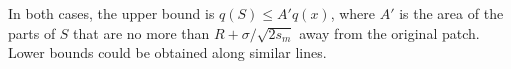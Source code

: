 \documentclass[10pt,letterpaper]{article}
\newcommand{\citet}[1]{\cite{#1}}
\begin{document}
In both cases,
the upper bound is $q(S) \le A' q(x)$,
where $A'$ is the area of the parts of $S$ that are no more than $R+\sigma/\sqrt{2s_m}$ away from the original patch.
Lower bounds could be obtained along similar lines.


% 
\end{document}
